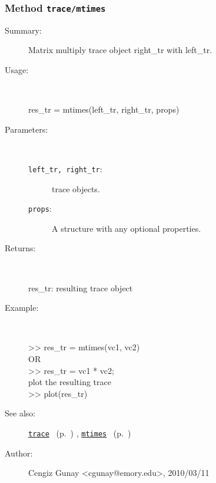 \subsubsection[Method \texttt{mtimes}]{Method \texttt{trace/mtimes}}%
%
\label{ref_trace__mtimes}%
\hypertarget{ref_trace__mtimes}{}%
\begin{description}
\item[Summary:]Matrix multiply trace object right\_tr with left\_tr.
%
\item[Usage:]~%
\begin{lyxcode}%
res\_tr = mtimes(left\_tr, right\_tr, props)
%
\end{lyxcode}%
%
%
\item[Parameters:]~
\begin{description}%
\item[\texttt{left\_tr, right\_tr}:]
 trace objects.
\item[\texttt{props}:]
 A structure with any optional properties.
\end{description}%
%
\item[Returns:
]~

   res\_tr: resulting trace object
%
\item[Example:]~
\begin{lyxcode} >> res\_tr = mtimes(vc1, vc2)
\\%
 OR
\\%
 >> res\_tr = vc1 * vc2;
\\%
 plot the resulting trace
\\%
 >> plot(res\_tr)
\\%
\end{lyxcode}
%
\item[See also:]%
\hyperlink{ref_trace}{\texttt{trace}}%
\ (p.~\pageref{ref_trace})%
%
, \hyperlink{ref_mtimes}{\texttt{mtimes}}%
\ (p.~\pageref{ref_mtimes})%
%
%
\item[Author:]%
Cengiz Gunay <cgunay@emory.edu>, 2010/03/11
%
\end{description}
\methodline%

